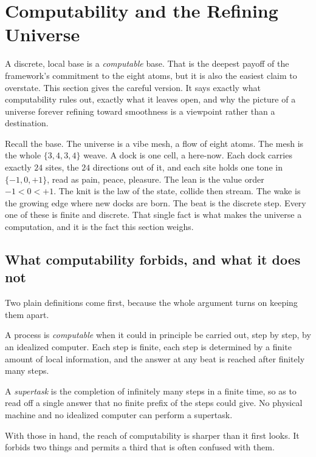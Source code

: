 \section{Computability and the Refining Universe}

A discrete, local base is a \emph{computable} base. That is the deepest payoff of the framework's commitment to the eight atoms, but it is also the easiest claim to overstate. This section gives the careful version. It says exactly what computability rules out, exactly what it leaves open, and why the picture of a universe forever refining toward smoothness is a viewpoint rather than a destination.

Recall the base. The universe is a vibe mesh, a flow of eight atoms. The mesh is the whole $\{3,4,3,4\}$ weave. A dock is one cell, a here-now. Each dock carries exactly $24$ sites, the $24$ directions out of it, and each site holds one tone in $\{-1, 0, +1\}$, read as pain, peace, pleasure. The lean is the value order $-1 < 0 < +1$. The knit is the law of the state, collide then stream. The wake is the growing edge where new docks are born. The beat is the discrete step. Every one of these is finite and discrete. That single fact is what makes the universe a computation, and it is the fact this section weighs.

\subsection{What computability forbids, and what it does not}

Two plain definitions come first, because the whole argument turns on keeping them apart.

\begin{definition}[Computable]
A process is \emph{computable} when it could in principle be carried out, step by step, by an idealized computer. Each step is finite, each step is determined by a finite amount of local information, and the answer at any beat is reached after finitely many steps.
\end{definition}

\begin{definition}[Supertask]
A \emph{supertask} is the completion of infinitely many steps in a finite time, so as to read off a single answer that no finite prefix of the steps could give. No physical machine and no idealized computer can perform a supertask.
\end{definition}

With those in hand, the reach of computability is sharper than it first looks. It forbids two things and permits a third that is often confused with them.

